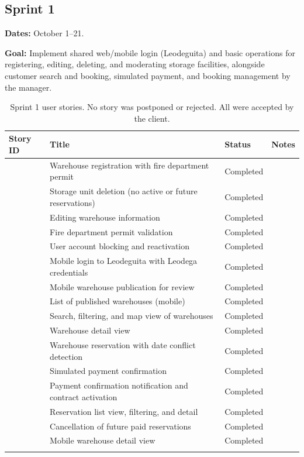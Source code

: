 \subsection{Sprint 1}
\label{sec:sprint1}

\textbf{Dates:} October 1--21.

\textbf{Goal:} Implement shared web/mobile login (Leodeguita) and basic operations for registering, editing, deleting, and moderating storage facilities, alongside customer search and booking, simulated payment, and booking management by the manager.

\begin{longtable}{@{}L{2cm}L{6.2cm}L{2.4cm}L{3.8cm}@{}}
  \toprule
  Story ID & Title & Status & Notes \\
  \midrule
  \endhead
   & Warehouse registration with fire department permit & Completed & \\
   & Storage unit deletion (no active or future reservations) & Completed & \\
   & Editing warehouse information & Completed & \\
   & Fire department permit validation & Completed & \\
   & User account blocking and reactivation & Completed & \\
   & Mobile login to Leodeguita with Leodega credentials & Completed & \\
   & Mobile warehouse publication for review & Completed & \\
   & List of published warehouses (mobile) & Completed & \\
   & Search, filtering, and map view of warehouses & Completed & \\
   & Warehouse detail view & Completed & \\
   & Warehouse reservation with date conflict detection & Completed & \\
   & Simulated payment confirmation & Completed & \\
   & Payment confirmation notification and contract activation & Completed & \\
   & Reservation list view, filtering, and detail & Completed & \\
   & Cancellation of future paid reservations & Completed & \\
   & Mobile warehouse detail view & Completed & \\
  \bottomrule
  \caption{Sprint 1 user stories. No story was postponed or rejected. All were accepted by the client.}
  \label{tab:sprint1-stories}
\end{longtable}

